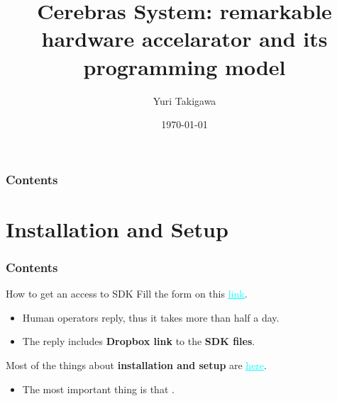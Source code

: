 \documentclass[dvipdfmx, 11pt, aspectratio=169]{beamer}   %
\title{Cerebras System: remarkable hardware accelarator and its programming model}
\author{Yuri Takigawa}
\institute{The university of Tokyo, EEIC, Taura Lab}
\date{\today}
\newcommand{\ulhref}[2]{\href{#1}{\textcolor{cyan}{\uline{#2}}}}
\begin{document}
\begin{frame}
  \titlepage       
\end{frame}
\begin{frame}
  \frametitle{Contents}
  \tableofcontents
\end{frame}
\section{Installation and Setup}
\begin{frame}
    \frametitle{Contents}
    \tableofcontents[currentsection]
\end{frame}
\begin{frame}{How to get an access to SDK}
Fill the form on this \ulhref{https://www.cerebras.ai/developers/sdk-request}{link}.
\begin{itemize}
    \item Human operators reply, thus it takes more than half a day.
    \item The reply includes \textbf{Dropbox link} to the \textbf{SDK files}.
\end{itemize}
Most of the things about \textbf{installation and setup} are \ulhref{https://sdk.cerebras.net/installation-guide}{here}.
\begin{itemize}
    \item The most important thing is that .
\end{itemize}
\end{frame}
\end{document}
